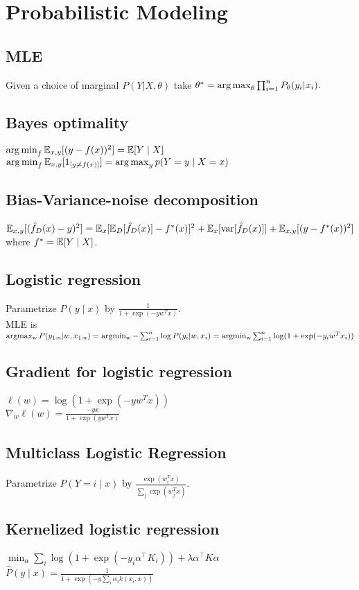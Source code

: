 \section*{Probabilistic Modeling}
\subsection*{MLE}
Given a choice of marginal $P(Y|X,\theta)$ take 
$\theta^* =\operatorname*{arg\,max}_\theta \prod_{i=1}^n {P_\theta}(y_i|x_i).$

\subsection*{Bayes optimality}
$\operatorname*{arg\,min}_f\mathbb{E}_{x,y}[(y-f(x))^2]=\mathbb{E}[Y\mid X]$\\
$\operatorname*{arg\,min}_f\mathbb{E}_{x,y}[1_{[y\neq f(x)]}]\\=\operatorname*{arg\,max}_yp(Y=y\mid X=x)$

\subsection*{Bias-Variance-noise decomposition}
$\mathbb{E}_{x,y}[(\hat{f}_D(x)- y)^2]\\=
\mathbb{E}_x[\mathbb{E}_D[\hat{f}_D(x)]-f^*(x)]^2\\
\hspace*{0.1mm}+\mathbb{E}_x[\operatorname{var}[\hat{f}_D(x)]]\\
\hspace*{0.1mm}+\mathbb{E}_{x,y}[(y-f^*(x))^2]$ where $f^*=\mathbb{E}[Y\mid X]$.


\subsection*{Logistic regression}
Parametrize $P(y\mid x)$ by $\frac{1}{1+\exp(-y w^T x)}$.\\
MLE is $\operatorname{argmax_w} P(y_{1:n}|w,x_{1:n})\\
= \operatorname{argmin_w} - \sum_{i=1}^n \log P(y_i|w,x_i)\\
= \operatorname{argmin_w} \sum_{i=1}^n \log(1+\exp(-y_i w^T x_i))$

\subsection*{Gradient for logistic regression}
$\ell(w) = \log(1+\exp(-yw^Tx))$\\
$\nabla_w \ell(w) =\frac{-yx}{1+\exp(yw^Tx)}$

\subsection*{Multiclass Logistic Regression}
Parametrize $P(Y=i\mid x)$ by $\frac{\exp(w_i^Tx)}{\sum_j \exp(w_j^Tx)}$.

\subsection*{Kernelized logistic regression}
$\min_\alpha\sum_i\log(1+\exp(-y_i\alpha^\top K_i)) + \lambda\alpha^\top K \alpha$
$\hat{P}(y\mid x)=\frac{1}{1+\exp(-y\sum_i\alpha_ik(x_i,x))}$
\\